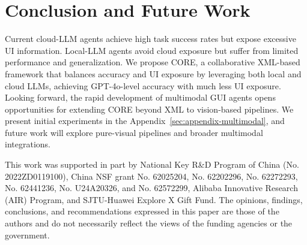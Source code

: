 \section{Conclusion and Future Work} 
Current cloud-LLM agents achieve high task success rates but expose excessive UI information. Local-LLM agents avoid cloud exposure but suffer from limited performance and generalization. We propose CORE, a collaborative XML-based framework that balances accuracy and UI exposure by leveraging both local and cloud LLMs, achieving GPT-4o-level accuracy with much less UI exposure. Looking forward, the rapid development of multimodal GUI agents opens opportunities for extending CORE beyond XML to vision-based pipelines. We present initial experiments in the Appendix~\ref{sec:appendix-multimodal}, and future work will explore pure-visual pipelines and broader multimodal integrations.

\begin{ack}
This work was supported in part by National Key R\&D Program of China (No. 2022ZD0119100), China NSF grant No. 62025204, No. 62202296, No. 62272293, No. 62441236, No. U24A20326, and No. 62572299, Alibaba Innovative Research (AIR) Program, and SJTU-Huawei Explore X Gift Fund. The opinions, findings, conclusions, and recommendations expressed in this paper are those of the authors and do not necessarily reflect the views of the funding agencies or the government.
\end{ack}
